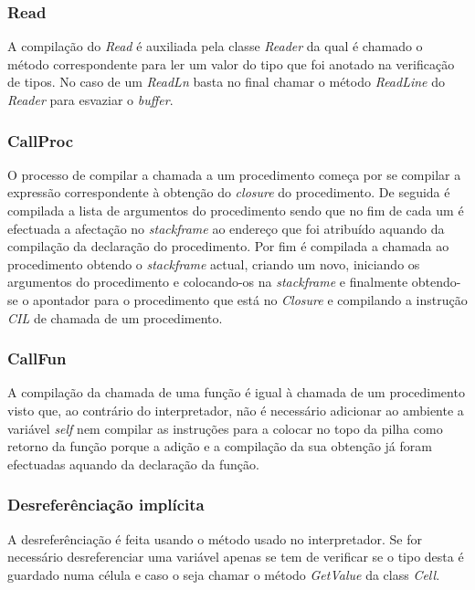 \subsubsection{Read}

A compilação do \emph{Read} é auxiliada pela classe \emph{Reader} da qual é 
chamado o método correspondente para ler um valor do tipo que foi anotado na 
verificação de tipos. No caso de um \emph{ReadLn} basta no final chamar o 
método \emph{ReadLine} do \emph{Reader} para esvaziar o \emph{buffer}.

\subsubsection{CallProc}

O processo de compilar a chamada a um procedimento começa por se compilar a 
expressão correspondente à obtenção do \emph{closure} do procedimento. De 
seguida é compilada a lista de argumentos do procedimento sendo que no fim de 
cada um é efectuada a afectação no \emph{stackframe} ao endereço que foi 
atribuído aquando da compilação da declaração do procedimento. Por fim é 
compilada a chamada ao procedimento obtendo o \emph{stackframe} actual, criando 
um novo, iniciando os argumentos do procedimento e colocando-os na 
\emph{stackframe} e finalmente obtendo-se o apontador para o procedimento que 
está no \emph{Closure} e compilando a instrução \emph{CIL} de chamada de um 
procedimento.

\subsubsection{CallFun}

A compilação da chamada de uma função é igual à chamada de um procedimento 
visto que, ao contrário do interpretador, não é necessário adicionar ao 
ambiente a variável \emph{self} nem compilar as instruções para a colocar no 
topo da pilha como retorno da função porque a adição e a compilação da sua 
obtenção já foram efectuadas aquando da declaração da função.

\subsubsection{Desreferênciação implícita}

A desreferênciação é feita usando o método usado no interpretador. Se for 
necessário desreferenciar uma variável apenas se tem de verificar se o tipo 
desta é guardado numa célula e caso o seja chamar o método \emph{GetValue} da 
class \emph{Cell}.

